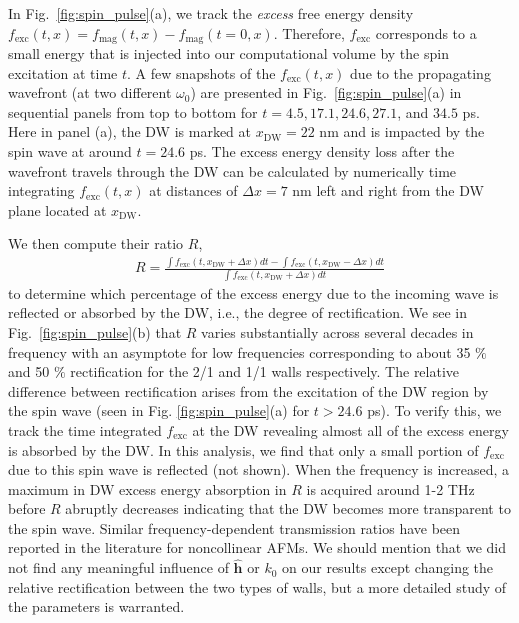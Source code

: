 \documentclass[%
 reprint,
superscriptaddress,
 amsmath,amssymb,
prb,
]{revtex4-1}
\begin{document}
%
In Fig.~\ref{fig:spin_pulse}(a), we track the \emph{excess} free energy density $f_\mathrm{exc}(t,x) = f_\mathrm{mag}(t,x) - f_\mathrm{mag}(t = 0,x)$.
%
Therefore, $f_\mathrm{exc}$ corresponds to a small energy that is injected into our computational volume by the spin excitation at time $t$.
%
A few snapshots of the $f_\mathrm{exc}(t,x)$ due to the propagating wavefront (at two different $\omega_0$) are presented in Fig.~\ref{fig:spin_pulse}(a) in sequential panels from top to bottom for $t = 4.5, 17.1, 24.6, 27.1$, and $34.5$ ps.
%
Here in panel (a), the DW is marked at $x_\mathrm{DW} = 22$ nm and is impacted by the spin wave at around $t = 24.6$ ps.
%
The excess energy density loss after the wavefront travels through the DW can be calculated by numerically time integrating $f_\mathrm{exc}(t,x)$ at distances of $\Delta x = 7$ nm left and right from the DW plane located at $x_\mathrm{DW}$.


%
We then compute their ratio $R$,
%
\begin{equation}\label{eqn:rec}
\begin{aligned}
    R = \frac{\int f_\mathrm{exc}(t, x_\mathrm{DW}+\Delta x) dt - \int f_\mathrm{exc}(t, x_\mathrm{DW}-\Delta x) dt}{\int f_\mathrm{exc}(t, x_\mathrm{DW}+\Delta x) dt}
\end{aligned}
\end{equation}
%
to determine which percentage of the excess energy due to the incoming wave is reflected or absorbed by the DW, i.e., the degree of rectification.
%
We see in Fig.~\ref{fig:spin_pulse}(b) that $R$ varies substantially across several decades in frequency with an asymptote for low frequencies corresponding to about 35 $\%$ and 50 $\%$ rectification for the 2/1 and 1/1 walls respectively.
%
The relative difference between rectification arises from the excitation of the DW region by the spin wave (seen in Fig. \ref{fig:spin_pulse}(a) for $t > 24.6$ ps).
%
To verify this, we track the time integrated $f_\mathrm{exc}$ at the DW revealing almost all of the excess energy is absorbed by the DW.
%
In this analysis, we find that only a small portion of $f_\mathrm{exc}$ due to this spin wave is reflected (not shown).
%
When the frequency is increased, a maximum in DW excess energy absorption in $R$ is acquired around 1-2 THz before $R$ abruptly decreases indicating that the DW becomes more transparent to the spin wave.
%
Similar frequency-dependent transmission ratios have been reported in the literature for noncollinear AFMs\cite{Rodrigues2021}.
%
We should mention that we did not find any meaningful influence of $\hat{\mathbf{h}}$ or $k_0$ on our results except changing the relative rectification between the two types of walls, but a more detailed study of the parameters is warranted.
%
\end{document}
